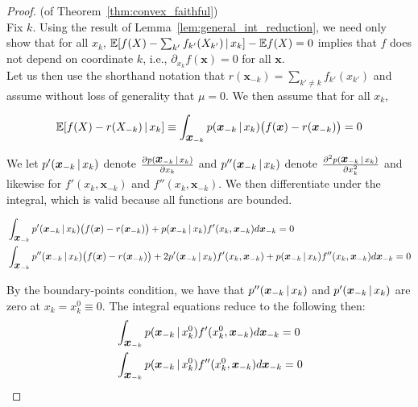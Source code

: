 \begin{proof} (of Theorem~\ref{thm:convex_faithful})\\
Fix $k$. Using the result of Lemma~\ref{lem:general_int_reduction}, we need only show that for all $x_k$, $ {\mathbb E}[ f(X) - \sum_{k'} f_{k'}(X_{k'}) {\,|\,} x_k] - {\mathbb E} f(X) = 0 $ implies that $f$ does not depend on coordinate $k$, i.e., $\partial_{x_k} f(\mathbf{x}) = 0$ for all $\mathbf{x}$.\\

Let us then use the shorthand notation that $r(\mathbf{x}_{-k}) = \sum_{k' \neq k} f_{k'}(x_{k'})$ and assume without loss of generality that $\mu = 0$. We then assume that for all $x_k$, 

\[
 {\mathbb E}[ f(X) - r(X_{-k})  {\,|\,} x_k] \equiv 
 \int_{\mbox{\boldmath $x$}_{-k}}  p(\mbox{\boldmath $x$}_{-k} {\,|\,} x_k ) 
 \big(f(\mbox{\boldmath $x$}) - r(\mbox{\boldmath $x$}_{-k}) \big) = 0
\]

We let $p'(\mbox{\boldmath $x$}_{-k} {\,|\,} x_k)$ denote 
$\frac{\partial p(\mbox{\boldmath $x$}_{-k} {\,|\,} x_k)}{\partial x_k}$ and 
$p''(\mbox{\boldmath $x$}_{-k} {\,|\,} x_k)$ denote 
$\frac{\partial^2 p(\mbox{\boldmath $x$}_{-k} {\,|\,} x_k)}{\partial x_k^2}$ and likewise for $f'(x_k, \mathbf{x}_{-k})$ and $f''(x_k, \mathbf{x}_{-k})$. We then differentiate under the integral, which is valid because all functions are bounded.

\begin{align}
& \int_{\mbox{\boldmath $x$}_{-k}} p'(\mbox{\boldmath $x$}_{-k} {\,|\,} x_k) 
\big( f(\mbox{\boldmath $x$}) - r(\mbox{\boldmath $x$}_{-k}) \big) + 
p(\mbox{\boldmath $x$}_{-k} {\,|\,} x_k) f'(x_k, \mbox{\boldmath $x$}_{-k}) d \mbox{\boldmath $x$}_{-k}  = 0 
\label{eqn:integral1a} \\
& \int_{\mbox{\boldmath $x$}_{-k}} p''(\mbox{\boldmath $x$}_{-k} {\,|\,} x_k) 
\big( f(\mbox{\boldmath $x$}) - r(\mbox{\boldmath $x$}_{-k}) \big)  + 
2 p'(\mbox{\boldmath $x$}_{-k} {\,|\,} x_k) f'(x_k, \mbox{\boldmath $x$}_{-k}) +
p(\mbox{\boldmath $x$}_{-k} {\,|\,} x_k) f''(x_k, \mbox{\boldmath $x$}_{-k}) d\mbox{\boldmath $x$}_{-k}  = 0 
\end{align}

By the boundary-points condition, we have that $p''(\mbox{\boldmath $x$}_{-k} {\,|\,} x_k)$ and $p'(\mbox{\boldmath $x$}_{-k} {\,|\,} x_k)$ are zero at $x_k = x_k^0 \equiv 0$. The integral equations reduce to the following then:
\begin{align}
& \int_{\mbox{\boldmath $x$}_{-k}} p(\mbox{\boldmath $x$}_{-k} {\,|\,} x^0_k) f'(x^0_k, \mbox{\boldmath $x$}_{-k}) d \mbox{\boldmath $x$}_{-k}= 0 \label{eqn:integral1b} \\
& \int_{\mbox{\boldmath $x$}_{-k}} p(\mbox{\boldmath $x$}_{-k} {\,|\,} x^0_k) f''(x^0_k, \mbox{\boldmath $x$}_{-k}) d\mbox{\boldmath $x$}_{-k} = 0
\end{align}


\end{proof}
